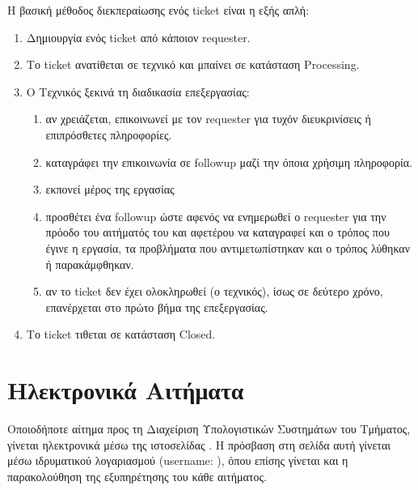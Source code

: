 \documentclass[letterpaper,10pt,greek]{sphinxhowto}
\begin{document}
\sphinxAtStartPar
Η βασική μέθοδος διεκπεραίωσης ενός ticket είναι η εξής απλή:
\begin{enumerate}
%
\item {} 
\sphinxAtStartPar
Δημιουργία ενός ticket από κάποιον requester.

\item {} 
\sphinxAtStartPar
Το ticket ανατίθεται σε τεχνικό και μπαίνει σε κατάσταση Processing.

\item {} 
\sphinxAtStartPar
Ο Τεχνικός ξεκινά τη διαδικασία επεξεργασίας:
\begin{enumerate}
%
\item {} 
\sphinxAtStartPar
αν χρειάζεται, επικοινωνεί με τον requester για τυχόν διευκρινίσεις ή επιπρόσθετες πληροφορίες.

\item {} 
\sphinxAtStartPar
καταγράφει την επικοινωνία σε followup μαζί την όποια χρήσιμη πληροφορία.

\item {} 
\sphinxAtStartPar
εκπονεί μέρος της εργασίας

\item {} 
\sphinxAtStartPar
προσθέτει ένα followup ώστε αφενός να ενημερωθεί ο requester για την πρόοδο του αιτήματός του και αφετέρου να καταγραφεί και ο τρόπος που έγινε η εργασία, τα προβλήματα που αντιμετωπίστηκαν και ο τρόπος λύθηκαν ή παρακάμφθηκαν.

\item {} 
\sphinxAtStartPar
αν το ticket δεν έχει ολοκληρωθεί (ο τεχνικός), ίσως σε δεύτερο χρόνο, επανέρχεται στο πρώτο βήμα της επεξεργασίας.

\end{enumerate}

\item {} 
\sphinxAtStartPar
Το ticket τιθεται σε κατάσταση Closed.

\end{enumerate}


\sphinxstepscope


\section{Ηλεκτρονικά Αιτήματα}
\label{\detokenize{HowToTicket:id1}}\label{\detokenize{HowToTicket::doc}}
\sphinxAtStartPar
Οποιοδήποτε αίτημα προς τη Διαχείριση Υπολογιστικών Συστημάτων
του Τμήματος, γίνεται ηλεκτρονικά μέσω της ιστοσελίδας
. Η πρόσβαση στη σελίδα αυτή
γίνεται μέσω ιδρυματικού λογαριασμού (username: ),
όπου επίσης γίνεται και η παρακολούθηση της εξυπηρέτησης του
κάθε αιτήματος.
\end{document}
